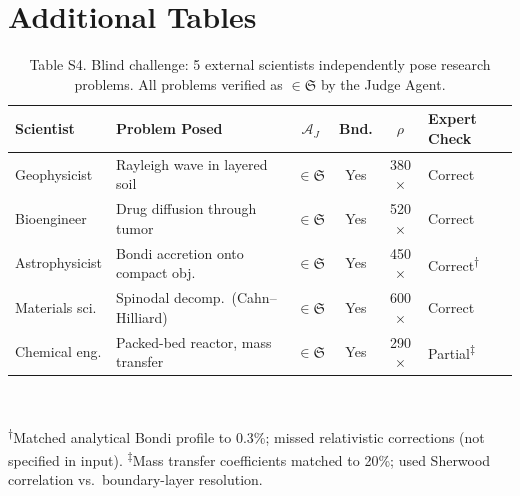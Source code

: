 \documentclass[11pt,a4paper]{article}
\newcommand{\Sclass}{\mathfrak{S}}
\newcommand{\Agent}{\mathcal{A}}
\begin{document}

\section*{Additional Tables}

\begin{table}[htbp]
\centering
\caption{Table S4. Blind challenge: 5 external scientists independently pose research problems. All problems verified as $\in \Sclass$ by the Judge Agent.}
\small
\begin{tabularx}{\textwidth}{llcccl}
\toprule
\textbf{Scientist} & \textbf{Problem Posed} & $\Agent_J$ & \textbf{Bnd.} & \textbf{$\rho$} & \textbf{Expert Check} \\
\midrule
Geophysicist & Rayleigh wave in layered soil & $\in \Sclass$ & Yes & 380$\times$ & Correct \\
Bioengineer & Drug diffusion through tumor & $\in \Sclass$ & Yes & 520$\times$ & Correct \\
Astrophysicist & Bondi accretion onto compact obj. & $\in \Sclass$ & Yes & 450$\times$ & Correct\textsuperscript{$\dagger$} \\
Materials sci. & Spinodal decomp.\ (Cahn--Hilliard) & $\in \Sclass$ & Yes & 600$\times$ & Correct \\
Chemical eng. & Packed-bed reactor, mass transfer & $\in \Sclass$ & Yes & 290$\times$ & Partial\textsuperscript{$\ddagger$} \\
\bottomrule
\end{tabularx}\\[3pt]
\raggedright\scriptsize \textsuperscript{$\dagger$}Matched analytical Bondi profile to 0.3\%; missed relativistic corrections (not specified in input). \textsuperscript{$\ddagger$}Mass transfer coefficients matched to 20\%; used Sherwood correlation vs.\ boundary-layer resolution.
\end{table}
\end{document}
